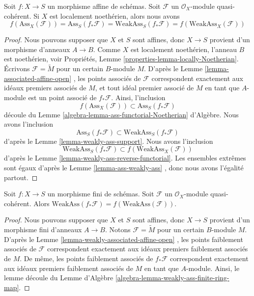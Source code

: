 \begin{lemma}
\label{lemma-ass-functorial-equal}
Soit  $f : X \to S$  un morphisme affine de schémas. Soit  $\mathcal{F}$  un
 $\mathcal{O}_X$-module quasi-cohérent. Si  $X$  est localement noethérien,
alors nous avons
$$
f(\text{Ass}_X(\mathcal{F})) =
\text{Ass}_S(f_*\mathcal{F}) =
\text{WeakAss}_S(f_*\mathcal{F}) =
f(\text{WeakAss}_X(\mathcal{F}))
$$
\end{lemma}

\begin{proof}
Nous pouvons supposer que  $X$  et  $S$  sont affines, donc
 $X \to S$  provient d'un morphisme d'anneaux  $A \to B$. Comme  $X$ 
est localement noethérien, l'anneau  $B$  est noethérien, voir Propriétés,
Lemme  \ref{properties-lemma-locally-Noetherian}. Écrivons  $\mathcal{F} = \widetilde M$  pour un certain  $B$-module
 $M$. D'après le Lemme  \ref{lemma-associated-affine-open} , les points associés de  $\mathcal{F}$ 
correspondent exactement aux idéaux premiers associés de  $M$, et tout
idéal premier associé de  $M$  en tant que  $A$-module est un point
associé de  $f_*\mathcal{F}$. Ainsi, l'inclusion
$$
f(\text{Ass}_X(\mathcal{F})) \subset \text{Ass}_S(f_*\mathcal{F})
$$
découle du Lemme  \ref{algebra-lemma-ass-functorial-Noetherian} d'Algèbre. Nous avons l'inclusion
$$
\text{Ass}_S(f_*\mathcal{F}) \subset \text{WeakAss}_S(f_*\mathcal{F})
$$
d'après le Lemme  \ref{lemma-weakly-ass-support}. Nous avons l'inclusion
$$
\text{WeakAss}_S(f_*\mathcal{F}) \subset f(\text{WeakAss}_X(\mathcal{F}))
$$
d'après le Lemme  \ref{lemma-weakly-ass-reverse-functorial}. Les ensembles extrêmes sont égaux d'après le Lemme
 \ref{lemma-ass-weakly-ass} , donc nous avons l'égalité partout.
\end{proof}

\begin{lemma}
\label{lemma-weakly-associated-finite}
Soit  $f : X \to S$  un morphisme fini de schémas. Soit  $\mathcal{F}$  un
 $\mathcal{O}_X$-module quasi-cohérent. Alors  $\text{WeakAss}(f_*\mathcal{F}) = f(\text{WeakAss}(\mathcal{F}))$.
\end{lemma}

\begin{proof}
Nous pouvons supposer que  $X$  et  $S$  sont affines, donc
 $X \to S$  provient d'un morphisme fini d'anneaux  $A \to B$. Notons
 $\mathcal{F} = \widetilde M$  pour un certain  $B$-module  $M$. D'après le Lemme
 \ref{lemma-weakly-associated-affine-open} , les points faiblement associés de  $\mathcal{F}$  correspondent
exactement aux idéaux premiers faiblement associés de  $M$. De
même, les points faiblement associés de  $f_*\mathcal{F}$  correspondent exactement aux
idéaux premiers faiblement associés de  $M$  en tant que
 $A$-module. Ainsi, le lemme découle du Lemme d'Algèbre  \ref{algebra-lemma-weakly-ass-finite-ring-map}.
\end{proof}

